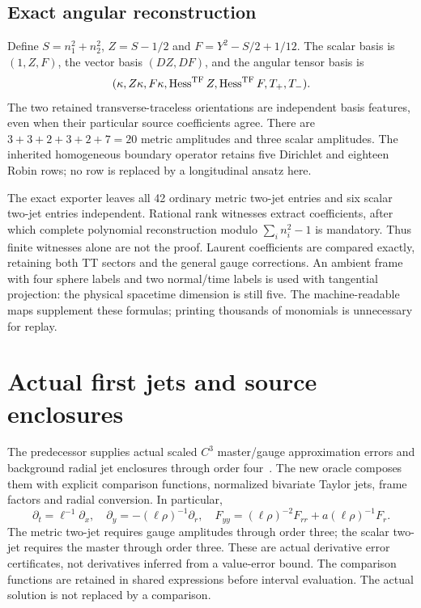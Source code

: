 \documentclass[11pt]{article}
\begin{document}
\subsection{Exact angular reconstruction}

Define $S=n_1^2+n_2^2$, $Z=S-1/2$ and $F=Y^2-S/2+1/12$.
The scalar basis is $(1,Z,F)$, the vector basis $(DZ,DF)$, and the angular
tensor basis is
\begin{equation}
 (\kappa,Z\kappa,F\kappa,\operatorname{Hess}^{\rm TF}Z,
 \operatorname{Hess}^{\rm TF}F,T_+,T_-).
\end{equation}
The two retained transverse-traceless orientations are independent basis
features, even when their particular source coefficients agree.
There are $3+3+2+3+2+7=20$ metric amplitudes and three scalar amplitudes.
The inherited homogeneous boundary operator retains five Dirichlet and
eighteen Robin rows; no row is replaced by a longitudinal ansatz here.

The exact exporter leaves all 42 ordinary metric two-jet entries and six
scalar two-jet entries independent. Rational rank witnesses extract
coefficients, after which complete polynomial reconstruction modulo
$\sum_i n_i^2-1$ is mandatory. Thus finite witnesses alone are not the proof.
Laurent coefficients are compared exactly, retaining both TT sectors and
the general gauge corrections. An ambient frame with four sphere labels and two normal/time labels is
used with tangential projection: the physical spacetime dimension is still
five. The machine-readable maps supplement these
formulas; printing thousands of monomials is unnecessary for replay.

\section{Actual first jets and source enclosures}

The predecessor supplies actual scaled $C^3$ master/gauge approximation
errors and background radial jet enclosures through order four~\cite{parent}.
The new oracle
composes them with explicit comparison functions, normalized bivariate
Taylor jets, frame factors and radial conversion. In particular,
\begin{equation}
 \partial_t=\ell^{-1}\partial_x,\quad
 \partial_y=-(\ell\rho)^{-1}\partial_r,\quad
 F_{yy}=(\ell\rho)^{-2}F_{rr}+a(\ell\rho)^{-1}F_r.
\end{equation}
The metric two-jet requires gauge amplitudes through order three; the scalar
two-jet requires the master through order three. These are actual derivative
error certificates, not derivatives inferred from a value-error bound.
The comparison functions are retained in shared expressions before interval
evaluation. The actual solution is not replaced by a comparison.
\end{document}
